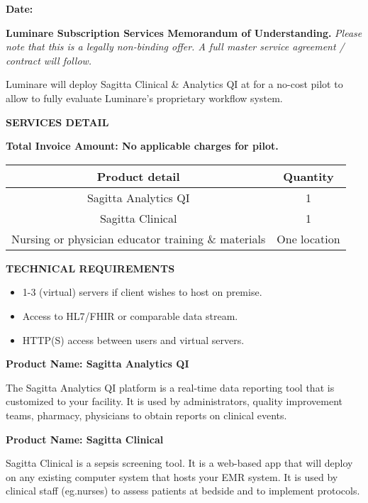 \documentclass[11pt,a4paper]{article} %
\providecommand{\tightlist}{%
  \setlength{\itemsep}{0pt}\setlength{\parskip}{0pt}}
\begin{document}
\textbf{Date: }

\textbf{Luminare Subscription Services Memorandum of Understanding.}
\emph{Please note that this is a legally non-binding offer. A full
master service agreement / contract will follow.}

Luminare will deploy Sagitta Clinical \& Analytics QI at
  for a  no-cost
pilot to allow  to fully evaluate Luminare's
proprietary workflow system.

\textbf{SERVICES DETAIL}

\textbf{Total Invoice Amount: No applicable charges for 
pilot.}

\begin{center}
\begin{tabular}{|c c|} 
 \hline
 Product detail & Quantity \\ [0.5ex] 
 \hline
 Sagitta Analytics QI & 1  \\ 
 \hline
 Sagitta Clinical & 1  \\
 \hline
 Nursing or physician educator training \& materials & One location  \\
 \hline
\end{tabular}   
\end{center}

\textbf{TECHNICAL REQUIREMENTS}

\begin{itemize}
\tightlist
\item
  1-3 (virtual) servers if client wishes to host on premise.
\item
  Access to HL7/FHIR or comparable data stream.
\item
  HTTP(S) access between users and virtual servers.
\end{itemize}

\textbf{Product Name: Sagitta Analytics QI}

The Sagitta Analytics QI platform is a real-time data reporting tool
that is customized to your facility. It is used by administrators,
quality improvement teams, pharmacy, physicians to obtain reports on
clinical events.

\textbf{Product Name: Sagitta Clinical}

Sagitta Clinical is a sepsis screening tool. It is a web-based app that
will deploy on any existing computer system that hosts your EMR system.
It is used by clinical staff (eg.nurses) to assess patients at bedside
and to implement protocols.
\end{document}
